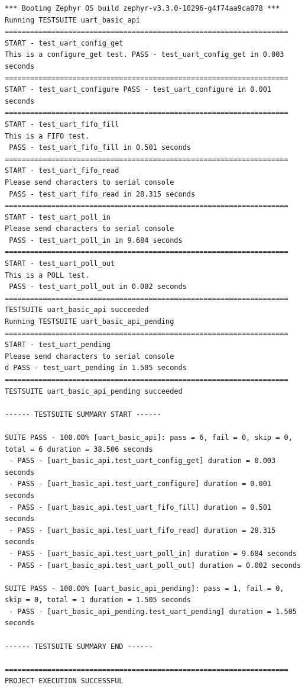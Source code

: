 \documentclass[11pt,a4paper,oneside]{article}
\begin{document}
\begin{lstlisting}
*** Booting Zephyr OS build zephyr-v3.3.0-10296-g4f74aa9ca078 ***
Running TESTSUITE uart_basic_api
===================================================================
START - test_uart_config_get
This is a configure_get test. PASS - test_uart_config_get in 0.003 seconds
===================================================================
START - test_uart_configure PASS - test_uart_configure in 0.001 seconds
===================================================================
START - test_uart_fifo_fill
This is a FIFO test.
 PASS - test_uart_fifo_fill in 0.501 seconds
===================================================================
START - test_uart_fifo_read
Please send characters to serial console
 PASS - test_uart_fifo_read in 28.315 seconds
===================================================================
START - test_uart_poll_in
Please send characters to serial console
 PASS - test_uart_poll_in in 9.684 seconds
===================================================================
START - test_uart_poll_out
This is a POLL test.
 PASS - test_uart_poll_out in 0.002 seconds
===================================================================
TESTSUITE uart_basic_api succeeded
Running TESTSUITE uart_basic_api_pending
===================================================================
START - test_uart_pending
Please send characters to serial console
d PASS - test_uart_pending in 1.505 seconds
===================================================================
TESTSUITE uart_basic_api_pending succeeded

------ TESTSUITE SUMMARY START ------

SUITE PASS - 100.00% [uart_basic_api]: pass = 6, fail = 0, skip = 0, total = 6 duration = 38.506 seconds
 - PASS - [uart_basic_api.test_uart_config_get] duration = 0.003 seconds
 - PASS - [uart_basic_api.test_uart_configure] duration = 0.001 seconds
 - PASS - [uart_basic_api.test_uart_fifo_fill] duration = 0.501 seconds
 - PASS - [uart_basic_api.test_uart_fifo_read] duration = 28.315 seconds
 - PASS - [uart_basic_api.test_uart_poll_in] duration = 9.684 seconds
 - PASS - [uart_basic_api.test_uart_poll_out] duration = 0.002 seconds

SUITE PASS - 100.00% [uart_basic_api_pending]: pass = 1, fail = 0, skip = 0, total = 1 duration = 1.505 seconds
 - PASS - [uart_basic_api_pending.test_uart_pending] duration = 1.505 seconds

------ TESTSUITE SUMMARY END ------

===================================================================
PROJECT EXECUTION SUCCESSFUL
\end{lstlisting}
\end{document}
